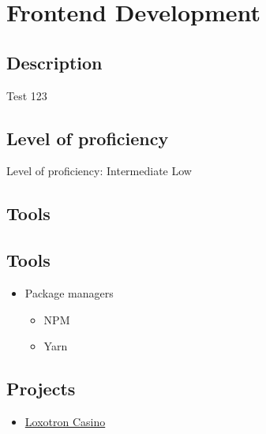 \section{Frontend Development}

\subsection{Description}

Test 123

\subsection{Level of proficiency}

Level of proficiency: Intermediate Low

\subsection{Tools}

\subsection{Tools}
\begin{itemize}
    \item Package managers
    \begin{itemize}
        \item NPM
        \item Yarn
    \end{itemize}

\end{itemize}

\subsection{Projects}

\begin{itemize}
    \item \hyperlink{proj_loxotron}{Loxotron Casino}
\end{itemize}

\newpage
